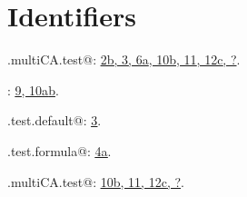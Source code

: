 \documentclass[reqno]{amsart}
\renewcommand{\NWlink}[2]{\hyperlink{#1}{#2}}
\begin{document}
\section{Identifiers}


{\small\begin{list}{}{\setlength{\itemsep}{-\parsep}\setlength{\itemindent}{-\leftmargin}}
\item \verb@.multiCA.test@: \underline{\NWlink{nuweb2b}{2b}}\NWlink{nuweb3}{, 3}\NWlink{nuweb6a}{, 6a}\NWlink{nuweb10b}{, 10b}\NWlink{nuweb11}{, 11}\NWlink{nuweb12c}{, 12c}\NWlink{nuweb?}{, ?}.
\item \verb@cnonct@: \underline{\NWlink{nuweb9}{9}}\NWlink{nuweb10a}{, 10a}\NWlink{nuweb10b}{b}.
\item \verb@multiCA.test.default@: \underline{\NWlink{nuweb3}{3}}.
\item \verb@multiCA.test.formula@: \underline{\NWlink{nuweb4a}{4a}}.
\item \verb@power.multiCA.test@: \underline{\NWlink{nuweb10b}{10b}}\NWlink{nuweb11}{, 11}\NWlink{nuweb12c}{, 12c}\NWlink{nuweb?}{, ?}.
\end{list}}
\end{document}
